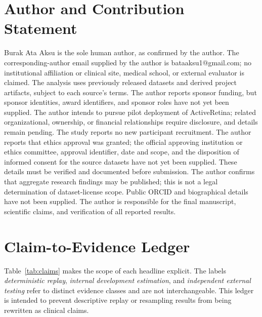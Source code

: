\documentclass{ieeeaccess}
\begin{document}
\section{Author and Contribution Statement}
Burak Ata Aksu is the sole human author, as confirmed by the author. The corresponding-author email supplied by the author is bataaksu1@gmail.com; no institutional affiliation or clinical site, medical school, or external evaluator is claimed. The analysis uses previously released datasets and derived project artifacts, subject to each source's terms. The author reports sponsor funding, but sponsor identities, award identifiers, and sponsor roles have not yet been supplied. The author intends to pursue pilot deployment of ActiveRetina; related organizational, ownership, or financial relationships require disclosure, and details remain pending. The study reports no new participant recruitment. The author reports that ethics approval was granted; the official approving institution or ethics committee, approval identifier, date and scope, and the disposition of informed consent for the source datasets have not yet been supplied. These details must be verified and documented before submission. The author confirms that aggregate research findings may be published; this is not a legal determination of dataset-license scope. Public ORCID and biographical details have not been supplied. The author is responsible for the final manuscript, scientific claims, and verification of all reported results.

\section{Claim-to-Evidence Ledger}
Table~\ref{tab:claims} makes the scope of each headline explicit. The labels \emph{deterministic replay}, \emph{internal development estimation}, and \emph{independent external testing} refer to distinct evidence classes and are not interchangeable. This ledger is intended to prevent descriptive replay or resampling results from being rewritten as clinical claims.
\end{document}
